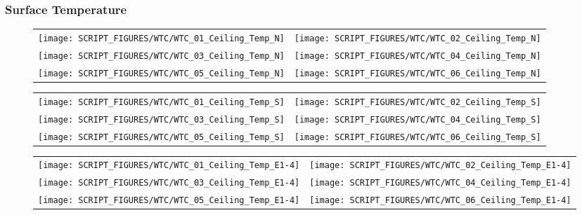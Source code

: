 \clearpage

\subsubsection{Surface Temperature}

\begin{figure}[!ht]
\begin{tabular*}{\textwidth}{l@{\extracolsep{\fill}}r}
\texttt{[image: SCRIPT\_FIGURES/WTC/WTC\_01\_Ceiling\_Temp\_N]} &
\texttt{[image: SCRIPT\_FIGURES/WTC/WTC\_02\_Ceiling\_Temp\_N]} \\
\texttt{[image: SCRIPT\_FIGURES/WTC/WTC\_03\_Ceiling\_Temp\_N]} &
\texttt{[image: SCRIPT\_FIGURES/WTC/WTC\_04\_Ceiling\_Temp\_N]} \\
\texttt{[image: SCRIPT\_FIGURES/WTC/WTC\_05\_Ceiling\_Temp\_N]} &
\texttt{[image: SCRIPT\_FIGURES/WTC/WTC\_06\_Ceiling\_Temp\_N]}
\end{tabular*}
\label{NIST_WTC_Ceiling_N}
\end{figure}

\begin{figure}[!ht]
\begin{tabular*}{\textwidth}{l@{\extracolsep{\fill}}r}
\texttt{[image: SCRIPT\_FIGURES/WTC/WTC\_01\_Ceiling\_Temp\_S]} &
\texttt{[image: SCRIPT\_FIGURES/WTC/WTC\_02\_Ceiling\_Temp\_S]} \\
\texttt{[image: SCRIPT\_FIGURES/WTC/WTC\_03\_Ceiling\_Temp\_S]} &
\texttt{[image: SCRIPT\_FIGURES/WTC/WTC\_04\_Ceiling\_Temp\_S]} \\
\texttt{[image: SCRIPT\_FIGURES/WTC/WTC\_05\_Ceiling\_Temp\_S]} &
\texttt{[image: SCRIPT\_FIGURES/WTC/WTC\_06\_Ceiling\_Temp\_S]}
\end{tabular*}
\label{NIST_WTC_Ceiling_S}
\end{figure}

\begin{figure}[!ht]
\begin{tabular*}{\textwidth}{l@{\extracolsep{\fill}}r}
\texttt{[image: SCRIPT\_FIGURES/WTC/WTC\_01\_Ceiling\_Temp\_E1-4]} &
\texttt{[image: SCRIPT\_FIGURES/WTC/WTC\_02\_Ceiling\_Temp\_E1-4]} \\
\texttt{[image: SCRIPT\_FIGURES/WTC/WTC\_03\_Ceiling\_Temp\_E1-4]} &
\texttt{[image: SCRIPT\_FIGURES/WTC/WTC\_04\_Ceiling\_Temp\_E1-4]} \\
\texttt{[image: SCRIPT\_FIGURES/WTC/WTC\_05\_Ceiling\_Temp\_E1-4]} &
\texttt{[image: SCRIPT\_FIGURES/WTC/WTC\_06\_Ceiling\_Temp\_E1-4]}
\end{tabular*}
\label{NIST_WTC_Ceiling_E1-4}
\end{figure}

